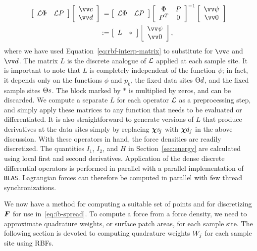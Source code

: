 \begin{equation}\label{eq:rbf-operator}
    \begin{aligned}
    \left[\begin{array}{cc}
            \L\Phi & \L P
    \end{array}\right]\left[\begin{array}{c}
            \arr{c} \\ \arr{d}
    \end{array}\right] &\hphantom{:}=
    \left[\begin{array}{cc}
            \L\Phi & \L P
    \end{array}\right]\left[\begin{array}{cc}
            \Phi & P \\ P^T & 0
    \end{array}\right]^{-1}\left[\begin{array}{c}
            \arr{\psi} \\ \arr{0}
    \end{array}\right] \\ &:=
    \left[\begin{array}{cc}
            L & \ast
    \end{array}\right]\left[\begin{array}{c}
            \arr{\psi} \\ \arr{0}
    \end{array}\right],
\end{aligned}
\end{equation}
where we have used Equation~\eqref{eq:rbf-interp-matrix} to substitute for $\arr{c}$ and
$\arr{d}$. The matrix $L$ is the discrete analogue of $\mathcal{L}$ applied at each sample site.
It is important to note that $L$ is completely independent of the function $\psi$; in
fact, it depends only on the functions $\phi$ and $p_k$, the fixed data sites
$\data\sites$, and the fixed sample sites $\sample\sites$.  The block marked by $\ast$ is
multiplied by zeros, and can be discarded. We compute a separate $L$ for each operator
$\mathcal{L}$ as a preprocessing step, and simply apply these matrices to any function that needs
to be evaluated or differentiated. It is also straightforward to generate versions of $L$
that produce derivatives at the data sites simply by replacing $\Xpsj$ with $\data\Xp_j$
in the above discussion. With these operators in hand, the force densities are readily
discretized. The quantities $I_1$, $I_2$, and $H$ in Section~\ref{sec:energy} are
calculated using local first and second derivatives. Application of the dense discrete
differential operators is performed in parallel with a parallel implementation of
\texttt{BLAS}. Lagrangian forces can therefore be computed in parallel with few thread
synchronizations.

We now have a method for computing a suitable set of points and for discretizing $\boldsymbol{F}$ for
use in~\eqref{eq:ib-spread}. To compute a force from a force density, we need to
approximate quadrature weights, or surface patch areas, for each sample site. The
following section is devoted to computing quadrature weights $\weight[j]$ for each
sample site using RBFs.

